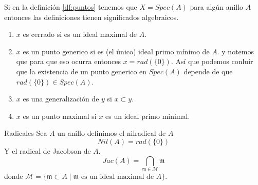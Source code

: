 \documentclass[14pt]{extarticle}
\begin{document}
\begin{ejemplo}{}{}
    Si en la definición \ref{df:puntos}
    tenemos que $X= Spec(A)$ para algún
    anillo $A$ entonces las definiciones
    tienen significados algebraicos.
    \begin{enumerate}
        \item $x$ es cerrado si es un 
        ideal maximal de $A$.
        \item $x$ es un punto generico si 
        es (el único) ideal primo mínimo de $A$.
        y notemos que para que eso ocurra entonces
        $x = rad(\{0\})$. Así que podemos conluir que
        la existencia de un  punto generico en $Spec(A)$
        depende de que $rad(\{0\}) \in Spec(A)$.
        \item $x$ es una generalización de $y$
        si $x \subset y$.
        \item $x$ es un punto maximal si $x$ es 
        un ideal primo minimal.
    \end{enumerate}
\end{ejemplo}

\begin{definicion}{Radicales}{}
    Sea $A$ un anillo definimos el nilradical de $A$
    $$Nil(A) = rad(\{0\})$$
    Y el radical de Jacobson de $A$.
    $$Jac(A) = \bigcap_{\mathfrak{m} \in \mathcal{M}} \mathfrak{m}$$
    donde $\mathcal{M} 
    = \{\mathfrak{m}\subset A \mid \mathfrak{m} \mbox{ es un ideal maximal de } A\}$.
\end{definicion}
\end{document}
